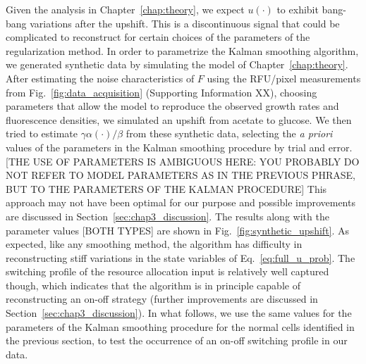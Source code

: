 Given the analysis in Chapter~\ref{chap:theory}, we expect $u(\cdot)$ to exhibit bang-bang variations after the upshift.
This is a discontinuous signal that could be complicated to reconstruct for certain choices of the parameters of the regularization method.
In order to parametrize the Kalman smoothing algorithm, we generated synthetic data by simulating the model of Chapter~\ref{chap:theory}.
After estimating the noise characteristics of $F$ using the RFU/pixel measurements from Fig.~\ref{fig:data_acquisition} (Supporting Information XX), choosing parameters that allow the model to reproduce the observed growth rates and fluorescence densities, we simulated an upshift from acetate to glucose.
We then tried to estimate $\gamma \alpha(\cdot) / \beta$ from these synthetic data, selecting the \textit{a priori} values of the parameters in the Kalman smoothing procedure by trial and error. [THE USE OF PARAMETERS IS AMBIGUOUS HERE: YOU PROBABLY DO NOT REFER TO MODEL PARAMETERS AS IN THE PREVIOUS PHRASE, BUT TO THE PARAMETERS OF THE KALMAN PROCEDURE]
This approach may not have been optimal for our purpose and possible improvements are discussed in Section~\ref{sec:chap3_discussion}.
The results along with the parameter values [BOTH TYPES] are shown in Fig.~\ref{fig:synthetic_upshift}.
As expected, like any smoothing method, the algorithm has difficulty in reconstructing stiff variations in the state variables of Eq.~\ref{eq:full_u_prob}.
The switching profile of the resource allocation input is relatively well captured though, which indicates that the algorithm is in principle capable of reconstructing an on-off strategy (further improvements are discussed in Section~\ref{sec:chap3_discussion}).
In what follows, we use the same values for the parameters of the Kalman smoothing procedure for the normal cells identified in the previous section, to test the occurrence of an on-off switching profile in our data.

